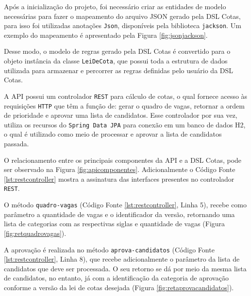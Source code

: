 Após a inicialização do projeto, foi necessário criar as entidades de modelo necessárias para fazer o mapeamento do arquivo JSON gerado pela DSL Cotas, para isso foi utilizadas anotações \texttt{Json}, disponíveis pela biblioteca \texttt{jackson}. Um exemplo do mapeamento é apresentado pela Figura \ref{fig:jsonjackson}. 



Desse modo, o modelo de regras gerado pela DSL Cotas é convertido para o objeto instância da classe \texttt{LeiDeCota}, que possui toda a estrutura de dados utilizada para armazenar e percorrer as regras definidas pelo usuário da DSL Cotas. 

A API possui um controlador \texttt{REST} para cálculo de cotas, o qual fornece acesso às requisições \texttt{HTTP} que têm a função de: gerar o quadro de vagas, retornar a ordem de prioridade e aprovar uma lista de candidatos. Esse controlador por sua vez, utiliza os recursos do \texttt{Spring Data JPA} para conexão em um banco de dados H2, o qual é utilizado como meio de processar e aprovar a lista de candidatos passada.


O relacionamento entre os principais componentes da \gls{API} e a DSL Cotas, pode ser observado na Figura \ref{fig:apicomponentes}. Adicionalmente o Código Fonte \ref{lst:restcontroller} mostra a assinatura das interfaces presentes no controlador \texttt{REST}.





\newpage
O método \texttt{quadro-vagas} (Código Fonte \ref{lst:restcontroller}, Linha 5), recebe como parâmetro a quantidade de vagas e o identificador da versão, retornando uma lista de categorias com as respectivas siglas e quantidade de vagas (Figura \ref{fig:retquadrovagas}).



A aprovação é realizada no método \texttt{aprova-candidatos} (Código Fonte \ref{lst:restcontroller}, Linha 8), que recebe adicionalmente o parâmetro da lista de candidatos que deve ser processada. O seu retorno se dá por meio da mesma lista de candidatos, no entanto, já com a identificação da categoria de aprovação conforme a versão da lei de cotas desejada (Figura \ref{fig:retaprovacandidatos}).


